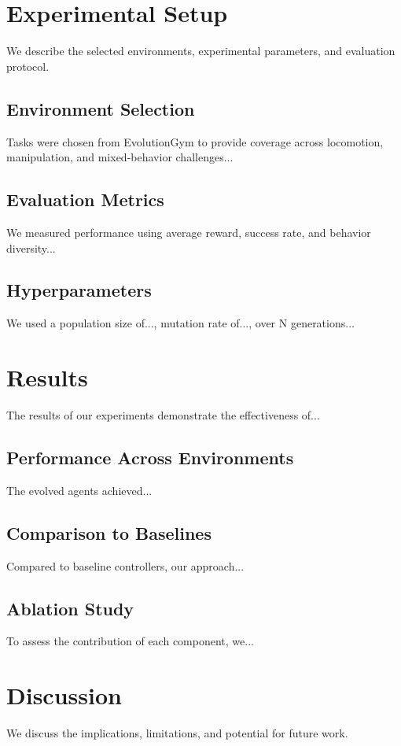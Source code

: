 \documentclass[journal,12pt,onecolumn]{IEEEtran}
\begin{document}
\section{Experimental Setup}
We describe the selected environments, experimental parameters, and evaluation protocol.

\subsection{Environment Selection}
Tasks were chosen from EvolutionGym to provide coverage across locomotion, manipulation, and mixed-behavior challenges...

\subsection{Evaluation Metrics}
We measured performance using average reward, success rate, and behavior diversity...

\subsection{Hyperparameters}
We used a population size of..., mutation rate of..., over N generations...

\section{Results}
The results of our experiments demonstrate the effectiveness of...

\subsection{Performance Across Environments}
The evolved agents achieved...

\subsection{Comparison to Baselines}
Compared to baseline controllers, our approach...

\subsection{Ablation Study}
To assess the contribution of each component, we...

\section{Discussion}
We discuss the implications, limitations, and potential for future work.
\end{document}
